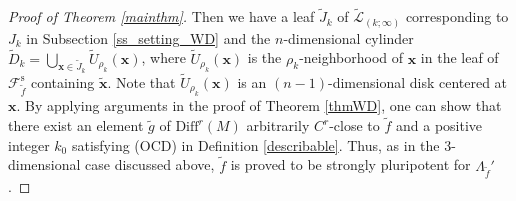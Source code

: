 \documentclass{amsart}
\theoremstyle{definition}
\numberwithin{equation}{section}
\numberwithin{figure}{section}
\begin{document}
\begin{proof}[Proof of Theorem \ref{mainthm}]
Then we have a leaf $\widetilde J_k$ of $\widetilde{\mathcal{L}}_{(k;\infty)}$ corresponding to $J_k$ in 
Subsection \ref{ss_setting_WD} and the $n$-dimensional cylinder $\widetilde{D}_k=\bigcup_{{\boldsymbol x}\in \widetilde J_k}\widetilde U_{\rho_k}({\boldsymbol x})$, 
where $\widetilde U_{\rho_k}({\boldsymbol x})$ is the $\rho_k$-neighborhood of ${\boldsymbol x}$ 
in the leaf of $\mathcal{F}_{\widetilde f}^{\mathrm{s}}$ containing $\widetilde{\boldsymbol x}$.
Note that $\widetilde U_{\rho_k}({\boldsymbol x})$ is an $(n-1)$-dimensional disk centered at ${\boldsymbol x}$.
By applying arguments in the proof of Theorem \ref{thmWD}, one can show 
that there exist an element $\widetilde g$ of $\mathrm{Diff}^r(M)$ arbitrarily $C^r$-close to $\widetilde f$ and a positive integer $k_0$ 
satisfying (OCD) in Definition \ref{describable}.
Thus, as in the 3-dimensional case discussed above,  
$\widetilde f$ is proved to be strongly pluripotent for $\Lambda_{\widetilde f}'$.
\end{proof}
\end{document}
